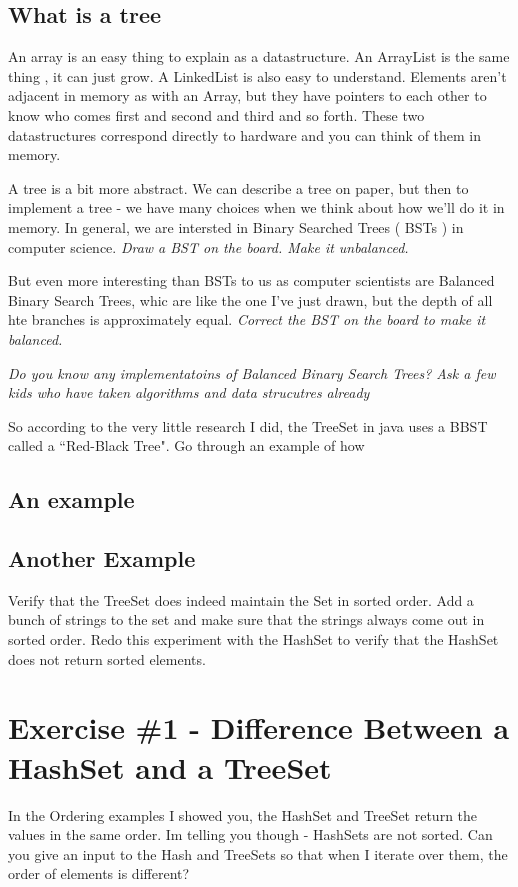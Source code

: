 \documentclass[12pt]{article}
\begin{document}
\subsection{What is a tree}
An array is an easy thing to explain as a datastructure. An ArrayList is the same thing , it can just grow. A LinkedList is also easy to understand. Elements aren't adjacent in memory as with an Array, but they have pointers to each other to know who comes first and second and third and so forth. These two datastructures correspond directly to hardware and you can think of them in memory. 

A tree is a bit more abstract. We can describe a tree on paper, but then to implement a tree - we have many choices when we think about how we'll do it in memory. In general, we are intersted in Binary Searched Trees ( BSTs ) in computer science. \textit{Draw a BST on the board. Make it unbalanced.}

But even more interesting than BSTs to us as computer scientists are Balanced Binary Search Trees, whic are like the one I've just drawn, but the depth of all hte branches is approximately equal. \textit{Correct the BST on the board to make it balanced.}

{\LARGE\textit{Do you know any implementatoins of Balanced Binary Search Trees? Ask a few kids who have taken algorithms and data strucutres already}}

So according to the very little research I did, the TreeSet in java uses a BBST called a ``Red-Black Tree". Go through an example of how 


\subsection{An example}



\subsection{Another Example}
Verify that the TreeSet does indeed maintain the Set in sorted order. Add a bunch of strings to the set and make sure that the strings always come out in sorted order.
Redo this experiment with the HashSet to verify that the HashSet does not return sorted elements.


\section{Exercise  \#1 - Difference Between a HashSet and a TreeSet}
In the Ordering examples I showed you, the HashSet and TreeSet return the values in the same order. Im telling you though - HashSets are not sorted. Can you give an input to the Hash and TreeSets so that when I iterate over them, the order of elements is different?
\end{document}
